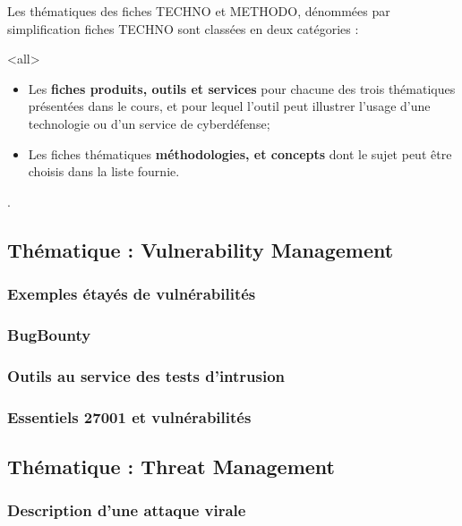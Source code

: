 Les thématiques des fiches TECHNO et METHODO, dénommées par  simplification fiches TECHNO sont classées en deux catégories :

\mode<all>{
{
\begin{itemize}
  \item Les\textbf{ fiches produits, outils et services }pour chacune des trois thématiques présentées dans le cours, et pour lequel l'outil peut illustrer l'usage d'une technologie ou d'un service  de cyberdéfense;
  \item Les fiches thématiques  \textbf{méthodologies,  et concepts } dont le sujet peut être choisis dans la liste fournie.
\end{itemize}
}} %


.

\subsection{Thématique : Vulnerability Management}
\subsubsection{Exemples étayés de vulnérabilités}
\subsubsection{BugBounty}
\subsubsection{Outils au service des tests d'intrusion}
\subsubsection{Essentiels 27001 et vulnérabilités}


\subsection{Thématique : Threat Management}
\subsubsection{Description d'une attaque virale}
